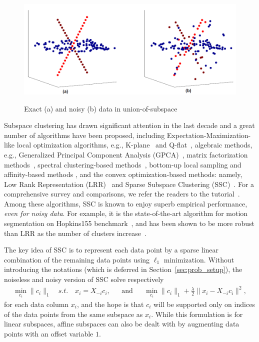 \documentclass[twoside,11pt]{article}
\numberwithin{equation}{section}
\begin{document}
\begin{figure}
  \centering
  \includegraphics[width=0.7\linewidth]{pics/Union_of_Subspace.png}\\
  \caption{Exact (a) and noisy (b) data in union-of-subspace}\label{fig:Union_of_sub_model}
\end{figure}

Subspace clustering has drawn significant attention in the last decade and a great number of algorithms have been proposed, including Expectation-Maximization-like local optimization algorithms, e.g., K-plane~\citep{bradley2000k-plane} and Q-flat~\citep{tseng2000qflat}, algebraic methods, e.g., Generalized Principal Component Analysis (GPCA)~\citep{vidal2005gpca}, matrix factorization methods~\citep{costeira1998motion_seg,costeira2000multibody_factorization}, spectral clustering-based methods~\citep{lauer2009spectral,chen2009spectral}, bottom-up local sampling and affinity-based methods \citep[e.g.,][]{yan2006LSA,rao2008motion}, and the convex optimization-based methods: namely, Low Rank Representation (LRR)~\citep{liu2010lrr_icml,liu2013LRR} and Sparse Subspace Clustering (SSC)~\citep{elhamifar2009ssc,elhamifar2012ssc_journal}. For a comprehensive survey and comparisons, we refer the readers to the tutorial~\citep{vidal2011tutorial}. Among these algorithms, SSC is known to enjoy superb empirical performance, {\em even for noisy data}. For example, it
is the state-of-the-art algorithm for motion segmentation on Hopkins155 benchmark~\citep{tron2007benchmark,elhamifar2009ssc}, and has been shown to be more robust than LRR as the number of clusters increase~\citep{elhamifar2012ssc_journal}.

The key idea of SSC is to represent each data point by a sparse linear combination of the remaining data points using $\ell_1$ minimization. Without introducing the notations (which is deferred in Section~\ref{sec:prob_setup}), the noiseless and noisy version of SSC solve respectively
\begin{align*}
  \min_{c_i} \|c_i\|_1\quad s.t.\quad x_i=X_{-i}c_i, && \text{and}&& \min_{c_i} \|c_i\|_1+\frac{\lambda}{2}\|x_i-X_{-i}c_i\|^2,
\end{align*}
for each data column $x_i$, and the hope is that $c_i$ will be supported only on indices of the data points from the same subspace as $x_i$. While this formulation is for linear subspaces, affine subspaces can also be dealt with by augmenting data points with an offset variable $1$.
\end{document}
